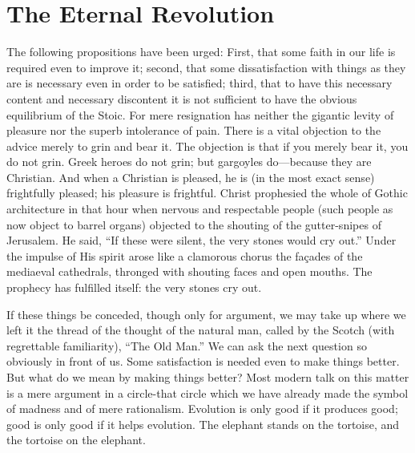 \documentclass{book}
\begin{document}
\chapter{The Eternal Revolution}
\label{chapter-6}
The following propositions have been urged: First, that some faith in our life is required even to improve it; second, that some dissatisfaction with things as they are is necessary even in order to be satisfied; third, that to have this necessary content and necessary discontent it is not sufficient to have the obvious equilibrium of the Stoic. For mere resignation has neither the gigantic levity of pleasure nor the superb intolerance of pain. There is a vital objection to the advice merely to grin and bear it. The objection is that if you merely bear it, you do not grin. Greek heroes do not grin; but gargoyles do—because they are Christian. And when a Christian is pleased, he is (in the most exact sense) frightfully pleased; his pleasure is frightful. Christ prophesied the whole of Gothic architecture in that hour when nervous and respectable people (such people as now object to barrel organs) objected to the shouting of the gutter-snipes of Jerusalem. He said, “If these were silent, the very stones would cry out.” Under the impulse of His spirit arose like a clamorous chorus the façades of the mediaeval cathedrals, thronged with shouting faces and open mouths. The prophecy has fulfilled itself: the very stones cry out.

If these things be conceded, though only for argument, we may take up where we left it the thread of the thought of the natural man, called by the Scotch (with regrettable familiarity), “The Old Man.” We can ask the next question so obviously in front of us. Some satisfaction is needed even to make things better. But what do we mean by making things better? Most modern talk on this matter is a mere argument in a circle-that circle which we have already made the symbol of madness and of mere rationalism. Evolution is only good if it produces good; good is only good if it helps evolution. The elephant stands on the tortoise, and the tortoise on the elephant.
\end{document}
